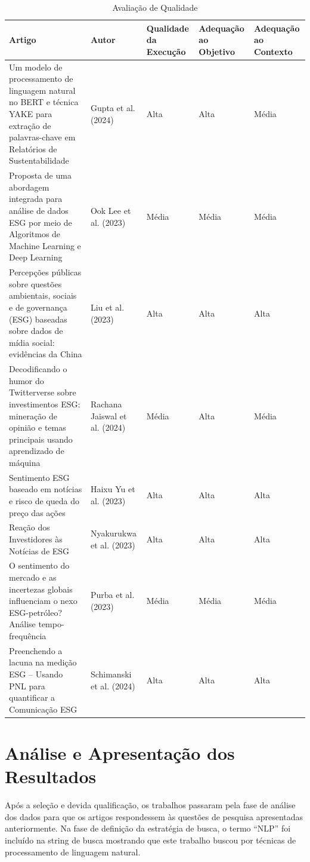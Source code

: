 \begin{table}[h]
\caption{Avaliação de Qualidade}
\label{tab:avaliacao-qualidade}
\begin{tabular}{p{5cm}p{2.5cm}p{2cm}p{2cm}p{2.5cm}}
\hline
\textbf{Artigo} & \textbf{Autor} & \textbf{Qualidade da Execução} & \textbf{Adequação ao Objetivo} & \textbf{Adequação ao Contexto} \\
\hline
Um modelo de processamento de linguagem natural no BERT e técnica YAKE para extração de palavras-chave em Relatórios de Sustentabilidade & Gupta et al. (2024) & Alta & Alta & Média \\
\hline
Proposta de uma abordagem integrada para análise de dados ESG por meio de Algoritmos de Machine Learning e Deep Learning & Ook Lee et al. (2023) & Média & Média & Média \\
\hline
Percepções públicas sobre questões ambientais, sociais e de governança (ESG) baseadas sobre dados de mídia social: evidências da China & Liu et al. (2023) & Alta & Alta & Alta \\
\hline
Decodificando o humor do Twitterverse sobre investimentos ESG: mineração de opinião e temas principais usando aprendizado de máquina & Rachana Jaiswal et al. (2024) & Média & Alta & Média \\
\hline
Sentimento ESG baseado em notícias e risco de queda do preço das ações & Haixu Yu et al. (2023) & Alta & Alta & Alta \\
\hline
Reação dos Investidores às Notícias de ESG & Nyakurukwa et al. (2023) & Alta & Alta & Alta \\
\hline
O sentimento do mercado e as incertezas globais influenciam o nexo ESG-petróleo? Análise tempo-frequência & Purba et al. (2023) & Média & Média & Média \\
\hline
Preenchendo a lacuna na medição ESG -- Usando PNL para quantificar a Comunicação ESG & Schimanski et al. (2024) & Alta & Alta & Alta \\
\hline
\end{tabular}
\end{table}

\section{Análise e Apresentação dos Resultados}
\label{sec:analise-rsl}

Após a seleção e devida qualificação, os trabalhos passaram pela fase de análise dos dados
para que os artigos respondessem às questões de pesquisa apresentadas anteriormente. Na fase de
definição da estratégia de busca, o termo ``NLP'' foi incluído na string de busca mostrando que este
trabalho buscou por técnicas de processamento de linguagem natural.

